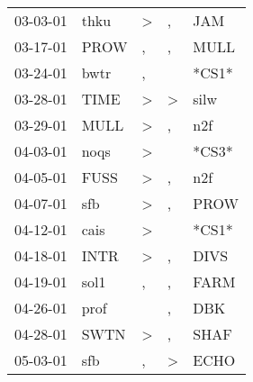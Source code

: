 \begin{supertabular}{p{0.07\textwidth}p{0.06\textwidth}p{0.02\textwidth}p{0.02\textwidth}p{0.06\textwidth}}
          03-03-01\textsuperscript{} &           thku\textsuperscript{} &     \textgreater &                , &            JAM\textsuperscript{} \\
          03-17-01\textsuperscript{} &           PROW\textsuperscript{} &                , &                , &           MULL\textsuperscript{} \\
          03-24-01\textsuperscript{} &           bwtr\textsuperscript{} &                , &                  &                            *CS1* \\
          03-28-01\textsuperscript{} &           TIME\textsuperscript{} &     \textgreater &     \textgreater &           silw\textsuperscript{} \\
          03-29-01\textsuperscript{} &           MULL\textsuperscript{} &     \textgreater &                , &            n2f\textsuperscript{} \\
          04-03-01\textsuperscript{} &           noqs\textsuperscript{} &     \textgreater &                  &                            *CS3* \\
          04-05-01\textsuperscript{} &           FUSS\textsuperscript{} &     \textgreater &                , &            n2f\textsuperscript{} \\
          04-07-01\textsuperscript{} &            sfb\textsuperscript{} &     \textgreater &                , &           PROW\textsuperscript{} \\
          04-12-01\textsuperscript{} &           cais\textsuperscript{} &     \textgreater &                  &                            *CS1* \\
          04-18-01\textsuperscript{} &           INTR\textsuperscript{} &     \textgreater &                , &           DIVS\textsuperscript{} \\
          04-19-01\textsuperscript{} &           sol1\textsuperscript{} &                , &                , &           FARM\textsuperscript{} \\
          04-26-01\textsuperscript{} &           prof\textsuperscript{} &                  &                , &            DBK\textsuperscript{} \\
          04-28-01\textsuperscript{} &           SWTN\textsuperscript{} &     \textgreater &                , &           SHAF\textsuperscript{} \\
          05-03-01\textsuperscript{} &            sfb\textsuperscript{} &                , &     \textgreater &           ECHO\textsuperscript{} \\

\end{supertabular}
